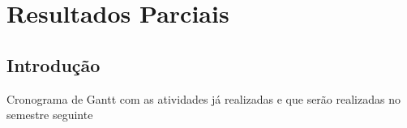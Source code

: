 \chapter[Resultados Parciais]{Resultados Parciais}

\section{Introdução}

Cronograma de Gantt com as atividades já realizadas e que serão realizadas no semestre seguinte
